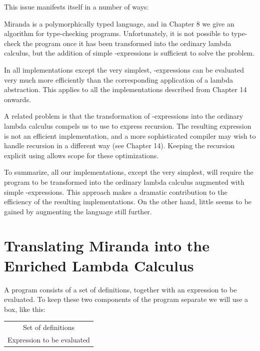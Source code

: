 This issue manifests itself in a number of ways:
\begin{numbered}
    \item Miranda is a polymorphically typed language, and in Chapter 8 we give an algorithm for type-checking programs. Unfortunately, it is not possible to type-check the program once it has been transformed into the ordinary lambda calculus, but the addition of simple -expressions is sufficient to solve the problem.
    \item In all implementations except the very simplest, -expressions can be evaluated very much more efficiently than the corresponding application of a lambda abstraction. This applies to all the implementations described from Chapter 14 onwards.
    \item A related problem is that the transformation of -expressions into the ordinary lambda calculus compels us to use  to express recursion. The resulting expression is not an efficient implementation, and a more
    sophisticated compiler may wish to handle recursion in a different way
    (see Chapter 14). Keeping the recursion explicit using  allows scope
    for these optimizations.
\end{numbered}

To summarize, all our implementations, except the very simplest, will require the program to be transformed into the ordinary lambda calculus augmented with simple -expressions. This approach makes a dramatic contribution to the efficiency of the resulting implementations. On the other hand, little seems to be gained by augmenting the language still further.

\section{Translating Miranda into the Enriched Lambda Calculus}
A program consists of a set of definitions, together with an expression to be evaluated. To keep these two components of the program separate we will use a box, like this:

\begin{center}
\setlength{\tabcolsep}{18pt}
\renewcommand{\arraystretch}{1.5}
\begin{tabular}{|c|}
    \hline
    Set of definitions \\
    \hdashline
    Expression to be evaluated \\
    \hline
\end{tabular}
\end{center}

